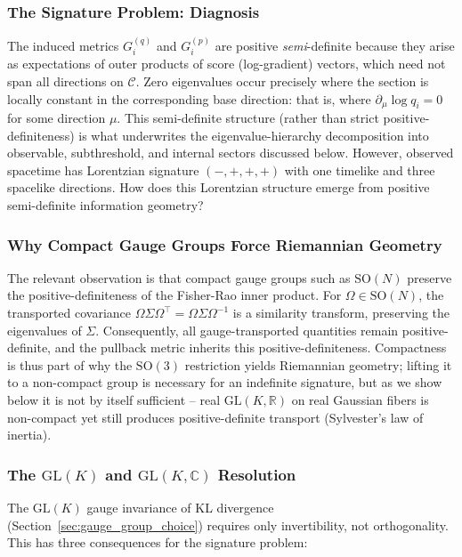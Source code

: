 \documentclass[11pt]{article}
\begin{document}
\subsubsection{The Signature Problem: Diagnosis}

The induced metrics $G_i^{(q)}$ and $G_i^{(p)}$ are positive \emph{semi}-definite because they arise as expectations of outer products of score (log-gradient) vectors, which need not span all directions on $\mathcal{C}$. Zero eigenvalues occur precisely where the section is locally constant in the corresponding base direction: that is, where $\partial_\mu \log q_i = 0$ for some direction $\mu$. This semi-definite structure (rather than strict positive-definiteness) is what underwrites the eigenvalue-hierarchy decomposition into observable, subthreshold, and internal sectors discussed below. However, observed spacetime has Lorentzian signature $(-,+,+,+)$ with one timelike and three spacelike directions. How does this Lorentzian structure emerge from positive semi-definite information geometry?

\subsubsection{Why Compact Gauge Groups Force Riemannian Geometry}

The relevant observation is that compact gauge groups such as $\mathrm{SO}(N)$ preserve the positive-definiteness of the Fisher-Rao inner product. For $\Omega \in \mathrm{SO}(N)$, the transported covariance $\Omega \Sigma \Omega^\top = \Omega \Sigma \Omega^{-1}$ is a similarity transform, preserving the eigenvalues of $\Sigma$. Consequently, all gauge-transported quantities remain positive-definite, and the pullback metric inherits this positive-definiteness. Compactness is thus part of why the $\mathrm{SO}(3)$ restriction yields Riemannian geometry; lifting it to a non-compact group is necessary for an indefinite signature, but as we show below it is not by itself sufficient -- real $\mathrm{GL}(K, \mathbb{R})$ on real Gaussian fibers is non-compact yet still produces positive-definite transport (Sylvester's law of inertia).

\subsubsection{The $\mathrm{GL}(K)$ and $\mathrm{GL}(K, \mathbb{C})$ Resolution}

The $\mathrm{GL}(K)$ gauge invariance of KL divergence (Section~\ref{sec:gauge_group_choice}) requires only invertibility, not orthogonality. This has three consequences for the signature problem:
\end{document}
